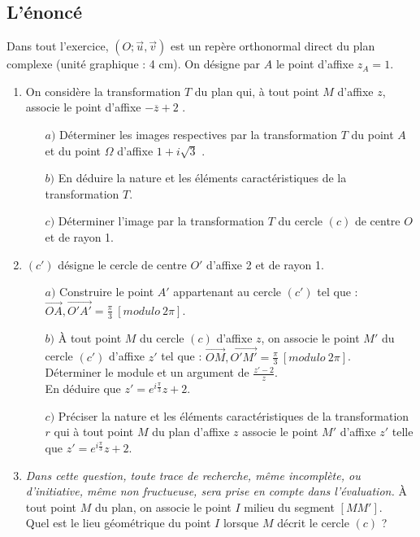 \documentclass[a4paper,11pt]{book}
\begin{document}
\subsection{L'\'enonc\'e}
Dans tout l'exercice, $(O;\overrightarrow{u},\overrightarrow{v})$ est un 
rep\`ere orthonormal direct du plan complexe (unit\'e graphique : 4 cm).
On d\'esigne par $A$ le point d'affixe $z_A = 1$.
\begin{enumerate}
\item On consid\`ere la transformation $T$ du plan qui, \`a tout point $M$ 
d'affixe $z$, associe le point d'affixe $-\overline{z}+2$        .
\begin{itemize}
\item[$a)$] D\'eterminer les images respectives par la transformation $T$ du 
point $A$ et du point $\Omega$ d'affixe $1+i\sqrt 3$        .
\item[$b)$] En d\'eduire la nature et les \'el\'ements caract\'eristiques de la
transformation $T$.
\item[$c)$] D\'eterminer l'image par la transformation $T$ du cercle $(c)$ de 
centre $O$ et de rayon 1.
\end{itemize}
\item $(c')$ d\'esigne le cercle de centre $O'$ d'affixe 2 et de rayon 1.
\begin{itemize}
\item[$a)$] Construire le point $A'$ appartenant au cercle $(c')$ tel que :\\
$\overrightarrow{OA},\overrightarrow{O'A'}=\displaystyle\frac{\pi}{3}\ [modulo\ 2\pi]$.
 \item[$b)$] \`A tout point $M$ du cercle $(c)$ d'affixe $z$, on associe le 
point $M'$ du cercle $(c')$ d'affixe $z'$ tel que :
$\overrightarrow{OM},\overrightarrow{O'M'}=\displaystyle\frac{\pi}{3}\ [modulo\ 2\pi]$.\\
D\'eterminer le module et un argument de $\displaystyle\frac{z'-2}{z}$.\\ 
En d\'eduire que $\displaystyle z'=e^{i\frac{\pi}{3}}z+2$.
\item[$c)$] Pr\'eciser la nature et les \'el\'ements caract\'eristiques de la 
transformation $r$ qui \`a tout point $M$ du plan d'affixe $z$ associe le point
$M'$ d'affixe $z'$ telle que $z'=e^{i \frac{\pi}{3}}z+2$.
 \end{itemize}
\item {\it Dans cette question, toute trace de recherche, m\^eme incompl\`ete, ou d'initiative, m\^eme non fructueuse, sera prise en compte dans l'\'evaluation.
} 
\`A tout point $M$ du plan, on associe le point $I$ milieu du 
segment $[MM']$.\\
Quel est le lieu g\'eom\'etrique du point $I$ lorsque $M$ d\'ecrit le cercle 
$(c)$ ?
\end{enumerate} 
\end{document}
